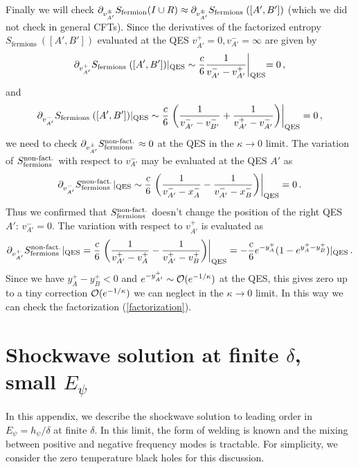\documentclass[12pt]{article}
\newcommand{\p}{\partial}
\newcommand{\f}{\frac}
\newcommand{\ra}{\rangle}
\let\l=\lambda \let\m=\mu \let\n=\nu \let\x=\xi \let\p=\phi \let\r=v
\let\f=\frac
\def\ba{\begin{eqnarray}}
\def\ea{\end{eqnarray}}
\renewcommand{\p}{\partial}
\numberwithin{equation}{section}
\def\m{{\mu}}
\def\n{{\nu}}
\def\p{{\phi}}
\def\CO{{\cal O}}
\def\pp{\partial}
\def\ba{\begin{eqnarray}}
\def\ea{\end{eqnarray}}
\def\r{\rightarrow}
\def\f {\frac}
\def\l{\left}
\def\r{\right}
\def\ra{\rightarrow}
\def\x{\bar{x}}
\renewcommand{\p}{\partial}
\begin{document}
\begin{spacing}{1.1}
Finally we will check $\pp_{v^\pm_{A'}}S_{\rm fermion}(I\cup R)\approx\pp_{v^\pm_{A'}}S_{\text {fermions }}([A',B'])$ (which we did not check in general CFTs). Since the derivatives of the factorized entropy $S_{\text {fermions }}([A',B'])$  evaluated at the QES $v^+_{A'}=0, v^-_{A'}=\infty$ are given by
\ba
\pp_{v^+_{A'}} S_{\text {fermions }}([A',B'])|_{\rm QES}\sim \f{c}{6}\f{1}{v^-_{A'}-v^+_{A'}}\biggl|_{\rm QES}=0\, ,
\ea
and
\ba
\pp_{v^-_{A'}} S_{\text {fermions }}([A',B'])|_{\rm QES}\sim\f{c}{6}\l.\l(\f{1}{v^-_{A'}-v^-_{B'}}+\f{1}{v^+_{A'}-v^-_{A'}}\r)\r|_{\rm QES}=0\, ,\ea
 we need to check $\pp_{v^\pm_{A'}} S^{\rm non\mathchar`-fact.}_{\text {fermions }}\approx 0$ at the QES in the $\kappa \ra 0$ limit. The variation of $S^{\rm non\mathchar`-fact.}_{\text {fermions }}$ with respect to $v^-_{A'}$ may be evaluated at the QES $A'$ as
\ba
\pp_{v^-_{A'}} S^{\rm non\mathchar`-fact.}_{\text {fermions }}|_{\rm QES}\sim\f{c}{6}\l.\l(\f{1}{v^-_{A'}-x^-_A}-\f{1}{v^-_{A'}-x^-_B}\r)\r|_{\rm QES}=0\, .
\ea
Thus we confirmed that $S^{\rm non\mathchar`-fact.}_{\text {fermions }}$ doesn't change the position of the right QES $A'$: $v^-_{A'}=0$.
The variation with respect to $v^+_{A'}$ is evaluated as
\ba
\pp_{v^+_{A'}} S^{\rm non\mathchar`-fact.}_{\text {fermions }}|_{\rm QES}=\f{c}{6}\l.\l(\f{1}{v^+_{A'}-v^+_{A}}-\f{1}{v^+_{A'}-v^+_{B}}\r)\r|_{\rm QES}=-\f{c}{6}e^{-y^+_A}(1-e^{y^+_A-y^+_B})|_{\rm QES}\, .
\ea
Since we have $y^+_A-y^+_B<0$ and $e^{-y^+_{A'}}\sim\CO( e^{-1/\kappa})$ at the QES, this gives zero up to a tiny correction $\CO( e^{-1/\kappa})$ we can neglect in the $\kappa\ra 0$ limit. In this way we can check the factorization (\ref{factorization}).


\section{Shockwave solution at finite $\delta$, small $E_{\psi}$}\label{app:secorderdelta}




In this appendix, we describe the shockwave solution to leading order in $E_{\psi} = h_{\psi}/\delta$ at finite $\delta$. In this limit, the form of welding is known and the mixing between positive and negative frequency modes is tractable. For simplicity, we consider the zero temperature black holes for this discussion.



\end{spacing}
\end{document}
